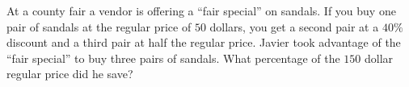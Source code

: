 At a county fair a vendor is offering a ``fair special'' on sandals. If you buy one pair of sandals at the regular price of $50$ dollars, you get a second pair at a $40\%$ discount and a third pair at half the regular price. Javier took advantage of the ``fair special'' to buy three pairs of sandals. What percentage of the $150$ dollar regular price did he save?
